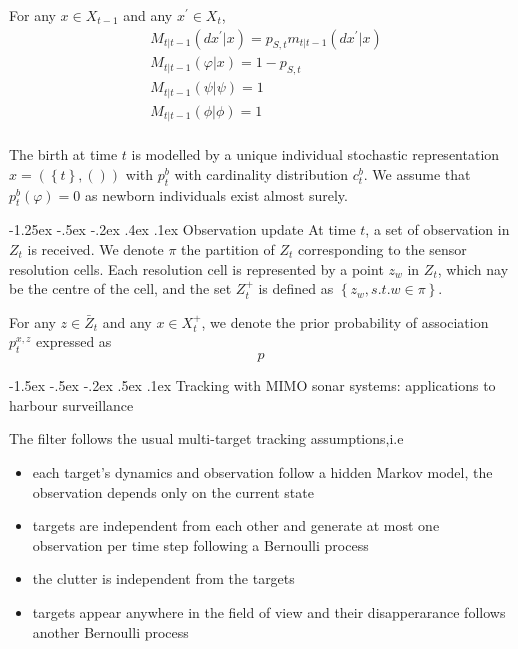 \documentclass[a4paper, 11pt]{article}
\makeatletter
\newcommand{\sihao}{\fontsize{14pt}{\baselineskip}\selectfont}
\newcommand{\xiaosihao}{\fontsize{12pt}{\baselineskip}\selectfont}
\renewcommand\section{\@startsection{section}{1}{\z@}%
{-1.5ex \@plus -.5ex \@minus -.2ex}%
{.5ex \@plus .1ex}%
{\normalfont\sihao\CJKfamily{hei}}}
\renewcommand\subsection{\@startsection{subsection}{1}{\z@}%
{-1.25ex \@plus -.5ex \@minus -.2ex}%
{.4ex \@plus .1ex}%
{\normalfont\xiaosihao\CJKfamily{hei}}}
\makeatother
\begin{document}
\begin{CJK}{UTF8}{gbsn}
For any $x \in X_{t-1}$ and any $x^{'} \in X_t$,
\begin{equation}
\begin{aligned}
& M_{t|t-1}(dx^{'}|x) = p_{S,t}m_{t|t-1}(dx^{'}|x)\\
& M_{t|t-1}(\varphi|x) =1 - p_{S,t}\\
& M_{t|t-1}(\psi|\psi) =1 \\
& M_{t|t-1}(\phi|\phi) =1 \\
\end{aligned}
\end{equation}


The birth at time $t$ is modelled by a unique individual stochastic representation $x = (\left\{ t \right\},())$ with $p_t^b$ with cardinality distribution $c_t^b$. We assume that $p_t^b(\varphi) = 0$ as newborn individuals exist almost surely.


\subsection{Observation update}
At time $t$, a set of observation in $Z_t$ is received. We denote $\pi$ the partition of $Z_t$ corresponding to the sensor resolution cells. Each resolution cell is represented by a point $z_{w}$ in $Z_t$, which nay be the centre of the cell, and the set $Z_t^+$ is defined as $\left\{z_w,s.t. w \in \pi  \right\}$.

For any $z \in \bar{Z}_t$ and any $x \in X_t^+$, we denote the prior probability of association $p_t^{x,z}$ expressed as
\begin{equation}
p
\end{equation}



\section{Tracking with MIMO sonar systems: applications
to harbour surveillance}

The filter follows the usual multi-target tracking assumptions,i.e
\begin{itemize}
\item each target's dynamics and observation follow a hidden Markov model, the observation depends only on the current state
\item targets are independent from each other and generate at most one observation per time step following a Bernoulli process
\item the clutter is independent from the targets
\item targets appear anywhere in the field of view and their disapperarance follows another Bernoulli process
\end{itemize}


\end{CJK}
\end{document}
